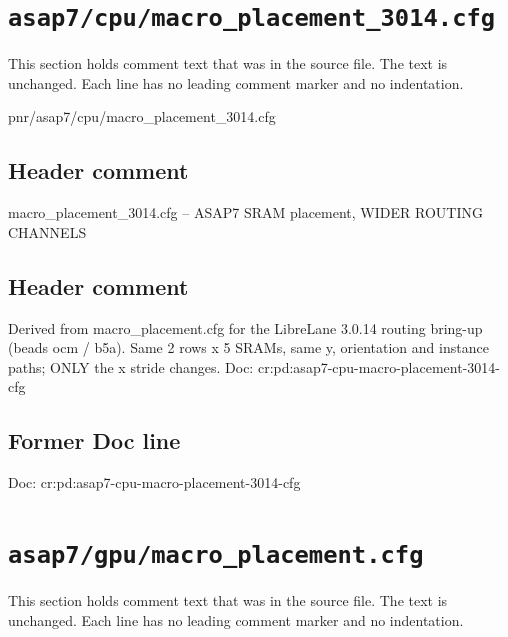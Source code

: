 \section{\texttt{asap7/cpu/macro\_placement\_3014.cfg}}\label{tm:pd:asap7-cpu-macro-placement-3014-cfg}

This section holds comment text that was in the source file. The text is unchanged. Each line has no leading comment marker and no indentation.

\begin{relocated}{pnr/asap7/cpu/macro_placement_3014.cfg}

\subsection*{Header comment}

\begin{textblock}
macro_placement_3014.cfg -- ASAP7 SRAM placement, WIDER ROUTING CHANNELS
\end{textblock}

\subsection*{Header comment}

\begin{textblock}
Derived from macro_placement.cfg for the LibreLane 3.0.14 routing bring-up
(beads ocm / b5a). Same 2 rows x 5 SRAMs, same y, orientation and instance
paths; ONLY the x stride changes.
Doc: cr:pd:asap7-cpu-macro-placement-3014-cfg
\end{textblock}

\subsection*{Former Doc line}

\begin{textblock}
Doc: cr:pd:asap7-cpu-macro-placement-3014-cfg
\end{textblock}

\end{relocated}

\section{\texttt{asap7/gpu/macro\_placement.cfg}}\label{tm:pd:asap7-gpu-macro-placement-cfg}

This section holds comment text that was in the source file. The text is unchanged. Each line has no leading comment marker and no indentation.

